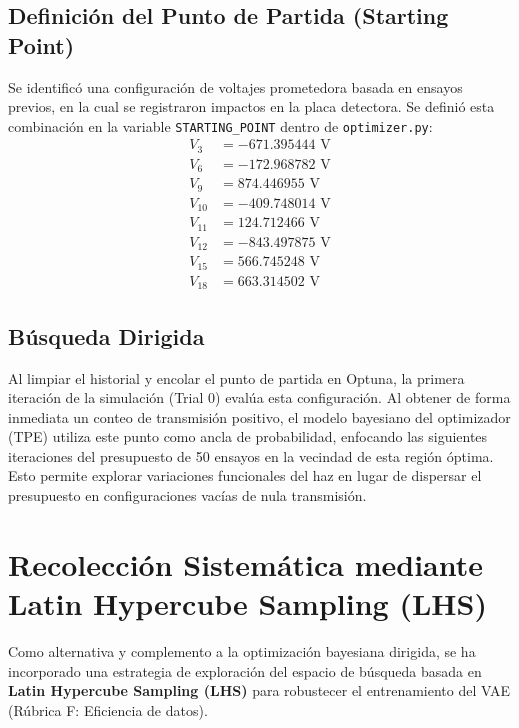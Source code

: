 \documentclass[12pt,letterpaper]{article}
\begin{document}
\subsection{Definición del Punto de Partida (Starting Point)}
Se identificó una configuración de voltajes prometedora basada en ensayos previos, en la cual se registraron impactos en la placa detectora. Se definió esta combinación en la variable \texttt{STARTING\_POINT} dentro de \texttt{optimizer.py}:
\begin{align*}
    V_3 &= -671.395444 \text{ V} \\
    V_6 &= -172.968782 \text{ V} \\
    V_9 &= 874.446955 \text{ V} \\
    V_{10} &= -409.748014 \text{ V} \\
    V_{11} &= 124.712466 \text{ V} \\
    V_{12} &= -843.497875 \text{ V} \\
    V_{15} &= 566.745248 \text{ V} \\
    V_{18} &= 663.314502 \text{ V}
\end{align*}

\subsection{Búsqueda Dirigida}
Al limpiar el historial y encolar el punto de partida en Optuna, la primera iteración de la simulación (Trial 0) evalúa esta configuración. Al obtener de forma inmediata un conteo de transmisión positivo, el modelo bayesiano del optimizador (TPE) utiliza este punto como ancla de probabilidad, enfocando las siguientes iteraciones del presupuesto de 50 ensayos en la vecindad de esta región óptima. Esto permite explorar variaciones funcionales del haz en lugar de dispersar el presupuesto en configuraciones vacías de nula transmisión.

\section{Recolección Sistemática mediante Latin Hypercube Sampling (LHS)}
Como alternativa y complemento a la optimización bayesiana dirigida, se ha incorporado una estrategia de exploración del espacio de búsqueda basada en \textbf{Latin Hypercube Sampling (LHS)} para robustecer el entrenamiento del VAE (Rúbrica F: Eficiencia de datos).
\end{document}
